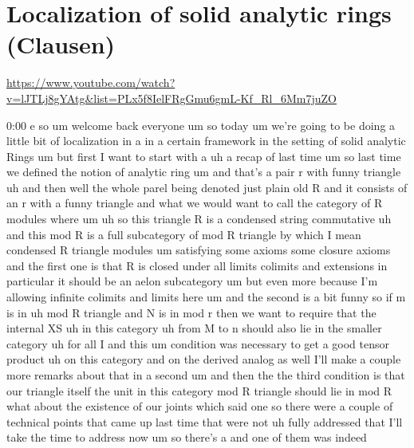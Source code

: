 
\section{\ufs Localization of solid analytic rings (Clausen)}

\url{https://www.youtube.com/watch?v=lJTLj8gYAtg&list=PLx5f8IelFRgGmu6gmL-Kf_Rl_6Mm7juZO}
\renewcommand{\yt}[2]{\href{https://www.youtube.com/watch?v=lJTLj8gYAtg&list=PLx5f8IelFRgGmu6gmL-Kf_Rl_6Mm7juZO&t=#1}{#2}}
\vspace{1em}

\begin{unfinished}{0:00}
e
so  um  welcome  back  everyone  um  so  today
um  we're  going  to  be  doing  a  little  bit
of  localization  in  a  in  a  certain
framework  in  the  setting  of  solid
analytic
Rings  um  but  first  I  want  to  start  with
a  uh  a  recap  of  last
time  um  so  last  time  we  defined  the
notion
of  analytic
ring  um  and  that's  a
pair  r  with  funny  triangle  uh  and  then
well  the  whole  parel  being  denoted  just
plain  old  R  and  it  consists  of  an  r  with
a  funny  triangle  and  what  we  would  want
to  call  the  category  of  R  modules
where  um
uh  so  this  triangle  R  is  a  condensed
string
commutative  uh  and  this  mod
R  is  a  full
subcategory  of  mod  R  triangle  by  which  I
mean  condensed  R  triangle
modules  um  satisfying  some  axioms  some
closure  axioms  and  the  first  one  is  that
R  is  closed
under  all  limits
colimits  and
extensions  in  particular  it  should  be  an
aelon
subcategory  um  but  even  more  because  I'm
allowing  infinite  colimits  and  limits
here  um  and  the  second  is  a  bit  funny  so
if  m  is  in  uh  mod  R  triangle  and  N  is  in
mod
r  then  we  want  to  require  that  the
internal
XS  uh  in  this  category  uh  from  M  to  n
should  also  lie  in  the  smaller
category  uh  for  all
I  and  this  um  condition  was  necessary  to
get  a
good  tensor  product  uh  on  this  category
and  on  the  derived  analog  as  well  I'll
make  a  couple  more  remarks  about  that  in
a  second  um  and  then  the  the  third
condition  is  that  our  triangle  itself
the  unit  in  this  category  mod  R  triangle
should  lie  in  mod
R  what  about  the  existence  of  our  joints
which  said  one  so  there  were  a  couple  of
technical  points  that  came  up  last  time
that  were  not  uh  fully  addressed  that
I'll  take  the  time  to  address  now  um  so
there's  a  and  one  of  them  was  indeed

\end{unfinished}
